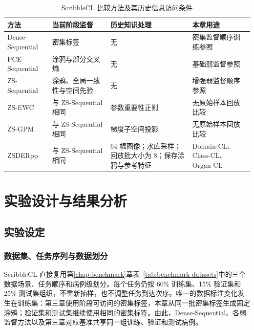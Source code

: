 \begin{table}[htbp]
\centering
\caption{ScribbleCL 比较方法及其历史信息访问条件}
\label{tab:scribblecl-methods}
\thesistablefont
\renewcommand{\arraystretch}{1.15}
\setlength{\tabcolsep}{3pt}
\begin{tabularx}{\textwidth}{@{}p{2.8cm}Xp{4.1cm}X@{}}
\toprule
方法 & 当前阶段监督 & 历史知识处理 & 本章用途 \\
\midrule
Dense-Sequential & 密集标签 & 无 & 密集监督顺序训练参照 \\
PCE-Sequential & 涂鸦与部分交叉熵 & 无 & 基础弱监督参照 \\
ZS-Sequential & 涂鸦、全局一致性与空间先验 & 无 & 增强弱监督顺序参照 \\
ZS-EWC & 与 ZS-Sequential 相同 & 参数重要性正则 & 无原始样本回放比较 \\
ZS-GPM & 与 ZS-Sequential 相同 & 梯度子空间投影 & 无原始样本回放比较 \\
ZSDERpp & 与 ZS-Sequential 相同 & 64 幅图像；水库采样；回放批大小为 8；保存涂鸦与参考特征 & Domain-CL、Class-CL、Organ-CL \\
\bottomrule
\end{tabularx}
\end{table}

\section{实验设计与结果分析}
\label{sec:scribblecl-experiments}

\subsection{实验设定}
\label{subsec:scribblecl-experimental-settings}

\subsubsection{数据集、任务序列与数据划分}
\label{subsubsec:scribblecl-datasets}

ScribbleCL 直接复用第\ref{chap:benchmark}章表~\ref{tab:benchmark-datasets}中的三个数据场景、任务顺序和病例级划分\cite{wang2026benchmark}。每个任务仍按 60\% 训练集、15\% 验证集和 25\% 测试集组织，不重新抽样，也不调整任务到达次序。唯一的数据标注变化发生在训练集：第三章使用阶段可访问的密集标签，本章从同一批密集标签生成固定涂鸦；验证集和测试集继续使用相同的密集标签。由此，Dense-Sequential、各弱监督方法以及第三章对应基准共享同一组训练、验证和测试病例。

